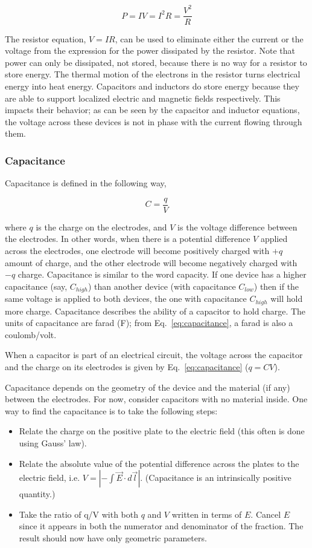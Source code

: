 \documentclass[12pt]{article}
\begin{document}
\begin{flushleft}
\[
P=IV= I^{2}R=\frac{V^{2}}{R}
\]

The resistor equation, $V=IR$, can be used to eliminate either the current or the voltage from the expression for the power dissipated by the resistor.  Note that power can only be dissipated, not stored, because there is no way for a resistor to store energy.  The thermal motion of the electrons in the resistor turns electrical  energy into heat energy.  Capacitors and inductors do store energy because they are able to support localized electric and magnetic fields respectively.  This impacts their behavior; as can be seen by the capacitor and inductor equations, the voltage across these devices is not in phase with the current flowing through them.

\subsubsection*{\bf Capacitance}

Capacitance is defined in the following way,

\begin{equation}
C=\frac{q}{V}
\label{eq:capacitance}
\end{equation}

where $q$ is the charge on the electrodes, and $V$ is the voltage difference between the electrodes.  In other words, when there is a potential difference $V$ applied across the electrodes, one electrode will become positively charged with $+q$ amount of charge, and the other electrode will become negatively charged with $-q$ charge.  Capacitance is similar to the word capacity.  If one device has a higher capacitance (say, $C_{high}$) than another device (with capacitance $C_{low}$) then if the same voltage is applied to both devices, the one with capacitance $C_{high}$ will hold more charge.  Capacitance describes the ability of a capacitor to hold charge.  The units of capacitance are farad (F); from Eq.~\ref{eq:capacitance}, a farad is also a coulomb/volt.

When a capacitor is part of an electrical circuit, the voltage across the capacitor and the charge on its electrodes is given by Eq.~\ref{eq:capacitance} ($q=CV$).

Capacitance depends on the geometry of the device and the material (if any) between the electrodes.  For now, consider capacitors with no material inside.  One way to find the capacitance is to take the following steps:

\begin{itemize}
\item Relate the charge on the positive plate to the electric field (this often is done using Gauss' law).
\item Relate the absolute value of the potential difference across the plates to the electric field, i.e. $V=|-\int{\vec{E} \cdot d\vec{l}}|$.  (Capacitance is an intrinsically positive quantity.)
\item Take the ratio of q/V with both $q$ and $V$ written in terms of $E$.  Cancel $E$ since it appears in both the numerator and denominator of the fraction.  The result should now have only geometric parameters.
\end{itemize}


\end{flushleft}
\end{document}
